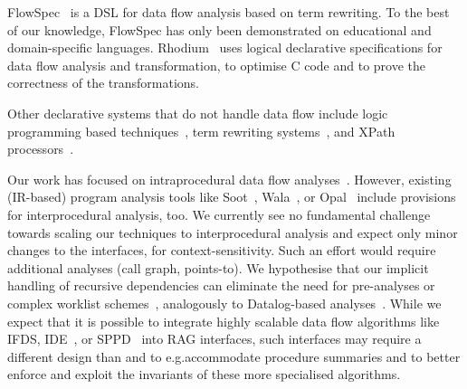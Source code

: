 FlowSpec~\cite{smits2020flowspec} is a DSL for data flow analysis
based on term rewriting.  To the best of our knowledge, FlowSpec has
only been demonstrated on educational and domain-specific
languages.
%
Rhodium~\cite{lerner2005automated} uses logical declarative
specifications for data flow analysis and transformation, to
optimise C code and to prove the correctness of the
transformations.

Other declarative systems  that do not handle data flow include
logic
programming based techniques~\cite{bravenboer09doop}, term
rewriting systems~\cite{visser04stratego}, and XPath
processors~\cite{copeland2005pmd}.

Our work has focused on intraprocedural data flow
analyses~\cite{kildall1973dataflow,kam1977monotone,cousot1977ai}.
However, existing (IR-based)
program analysis tools like Soot~\cite{vallee-rai10soot},
Wala~\cite{fink2012wala}, or
Opal~\cite{helm2020modular} include provisions for interprocedural
analysis, too.  We currently see no fundamental challenge towards
scaling our techniques to interprocedural analysis and expect
only minor changes to the {\intracfg} interfaces, for
context-sensitivity.  Such an effort would require additional
analyses (call graph, points-to).  We hypothesise that our
implicit handling of recursive dependencies can eliminate the need for
pre-analyses or complex worklist schemes~\cite{lhotak03scaling},
analogously to Datalog-based analyses~\cite{smaragdakis2010using}.
%
While we expect that it is possible to integrate highly
scalable data flow algorithms like IFDS,
IDE~\cite{reps1995ifds,sagiv1996ide}, or
 SPPD~\cite{spaeth2019pda} into RAG
interfaces, such interfaces may require a different
design than {\intracfg} and {\intraj} to e.g.\@ accommodate procedure
summaries and to better enforce and exploit the invariants
of these more specialised algorithms.


